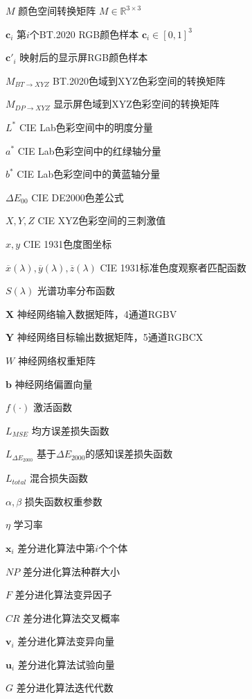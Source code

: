 \begin{denotation}[0mm][15mm]
	\item[$M$] 颜色空间转换矩阵 $M\in \mathbb{R}^{3\times 3}$
	\item[$\mathbf{c}_i$] 第$i$个BT.2020 RGB颜色样本 $\mathbf{c}_i \in [0,1]^3$
	\item[$\mathbf{c}'_i$] 映射后的显示屏RGB颜色样本
	\item[$M_{BT\rightarrow XYZ}$] BT.2020色域到XYZ色彩空间的转换矩阵
	\item[$M_{DP\rightarrow XYZ}$] 显示屏色域到XYZ色彩空间的转换矩阵
	\item[$L^*$] CIE Lab色彩空间中的明度分量
	\item[$a^*$] CIE Lab色彩空间中的红绿轴分量
	\item[$b^*$] CIE Lab色彩空间中的黄蓝轴分量
	\item[$\Delta E_{00}$] CIE DE2000色差公式
	\item[$X, Y, Z$] CIE XYZ色彩空间的三刺激值
	\item[$x, y$] CIE 1931色度图坐标
	\item[$\overline{x}(\lambda), \overline{y}(\lambda), \overline{z}(\lambda)$] CIE 1931标准色度观察者匹配函数
	\item[$S(\lambda)$] 光谱功率分布函数
	
	\item[$\mathbf{X}$] 神经网络输入数据矩阵，4通道RGBV
	\item[$\mathbf{Y}$] 神经网络目标输出数据矩阵，5通道RGBCX
	\item[$W$] 神经网络权重矩阵
	\item[$\mathbf{b}$] 神经网络偏置向量
	\item[$f(\cdot)$] 激活函数
	\item[$L_{MSE}$] 均方误差损失函数
	\item[$L_{\Delta E_{2000}}$] 基于$\Delta E_{2000}$的感知误差损失函数
	\item[$L_{total}$] 混合损失函数
	\item[$\alpha, \beta$] 损失函数权重参数
	\item[$\eta$] 学习率
	
	\item[$\mathbf{x}_i$] 差分进化算法中第$i$个个体
	\item[$NP$] 差分进化算法种群大小
	\item[$F$] 差分进化算法变异因子
	\item[$CR$] 差分进化算法交叉概率
	\item[$\mathbf{v}_i$] 差分进化算法变异向量
	\item[$\mathbf{u}_i$] 差分进化算法试验向量
	\item[$G$] 差分进化算法迭代代数
	

\end{denotation}
